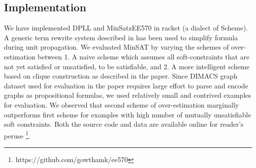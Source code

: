 \subsection{Implementation}
We have implemented DPLL and MinSatzEE570 in racket (a dialect of Scheme). A
generic term rewrite system described in \cite{rewrite} has been used to
simplify formula during unit propagation. We evaluated MinSAT by varying the
schemes of over-estimation between 1. A naive scheme which assumes all
soft-constraints that are not yet satisfied or unsatisfied, to be satisfiable,
and 2. A more intelligent scheme based on clique construction as described in
the paper. Since DIMACS graph dataset used for evaluation in the paper requires
large effort to parse and encode graphs as propositional formulas, we used
relatively small and contrived examples for evaluation. We observed that second
scheme of over-estimation marginally outperforms first scheme for examples with
high number of mutually unsatisfiable soft constraints. Both the source code and
data are available online for reader's peruse
\footnote{https://github.com/gowthamk/ee570}.

